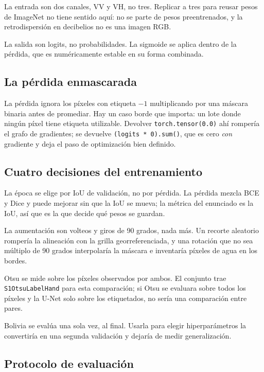 \documentclass{article}
\begin{document}
La entrada son dos canales, VV y VH, no tres. Replicar a tres para
reusar pesos de ImageNet no tiene sentido aquí: no se parte de pesos
preentrenados, y la retrodispersión en decibelios no es una imagen RGB.

La salida son logits, no probabilidades. La sigmoide se aplica dentro
de la pérdida, que es numéricamente estable en su forma combinada.

\subsection{La pérdida enmascarada}
\label{sec:perdida}

La pérdida ignora los píxeles con etiqueta $-1$ multiplicando por una máscara
binaria antes de promediar. Hay un caso borde que importa: un lote donde
ningún píxel tiene etiqueta utilizable. Devolver
\texttt{torch.tensor(0.0)} ahí rompería el grafo de gradientes; se devuelve
\texttt{(logits * 0).sum()}, que es cero \emph{con} gradiente y deja el paso de
optimización bien definido.

\subsection{Cuatro decisiones del entrenamiento}

La época se elige por IoU de validación, no por pérdida. La pérdida
mezcla BCE y Dice y puede mejorar sin que la IoU se mueva; la métrica del
enunciado es la IoU, así que es la que decide qué pesos se guardan.

La aumentación son volteos y giros de 90 grados, nada más. Un recorte
aleatorio rompería la alineación con la grilla georreferenciada, y una rotación
que no sea múltiplo de 90 grados interpolaría la máscara e inventaría píxeles de
agua en los bordes.

Otsu se mide sobre los píxeles observados por ambos. El
conjunto trae \texttt{S1Otsu\allowbreak LabelHand} para esta
comparación; si Otsu se evaluara sobre todos los píxeles y la U-Net solo sobre
los etiquetados, no sería una comparación entre pares.

Bolivia se evalúa una sola vez, al final. Usarla para elegir
hiperparámetros la convertiría en una segunda validación y dejaría de medir
generalización.

\subsection{Protocolo de evaluación}
\end{document}
